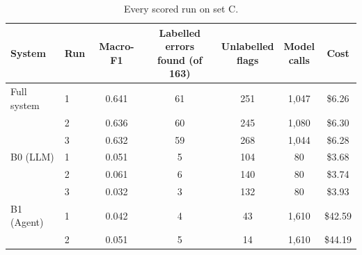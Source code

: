 \documentclass[11pt,a4paper]{article}
\begin{document}
\begin{table}[H]
\centering\small
\caption{Every scored run on set C.}
\begin{tabular}{@{}llccccc@{}}
\toprule
System & Run & Macro-F1 & \makecell{Labelled errors\\found (of 163)} & \makecell{Unlabelled\\flags} & \makecell{Model\\calls} & Cost \\
\midrule
Full system & 1 & 0.641 & 61 & 251 & 1,047 & \$6.26 \\
            & 2 & 0.636 & 60 & 245 & 1,080 & \$6.30 \\
            & 3 & 0.632 & 59 & 268 & 1,044 & \$6.28 \\
\midrule
B0 (LLM) & 1 & 0.051 & 5 & 104 & 80 & \$3.68 \\
   & 2 & 0.061 & 6 & 140 & 80 & \$3.74 \\
   & 3 & 0.032 & 3 & 132 & 80 & \$3.93 \\
\midrule
B1 (Agent) & 1 & 0.042 & 4 & 43 & 1,610 & \$42.59 \\
   & 2 & 0.051 & 5 & 14 & 1,610 & \$44.19 \\
\bottomrule
\end{tabular}
\end{table}
\end{document}
